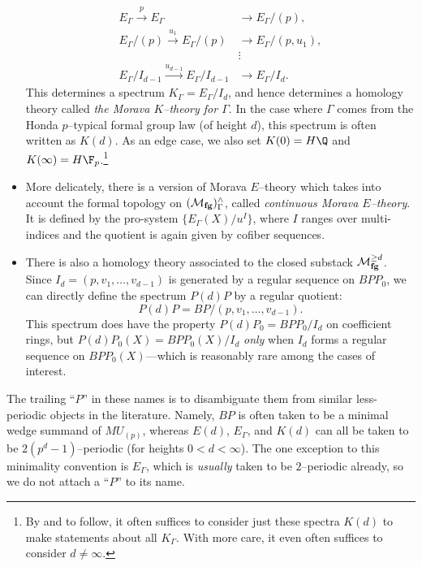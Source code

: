 \begin{definition}
\begin{itemize}
\begin{align*}
E_\Gamma \xrightarrow{p} E_\Gamma & \to E_\Gamma / (p), \\
E_\Gamma / (p) \xrightarrow{u_1} E_\Gamma / (p) & \to E_\Gamma / (p, u_1), \\
& \vdots \\
E_\Gamma / I_{d-1} \xrightarrow{u_{d-1}} E_\Gamma / I_{d-1} & \to E_\Gamma / I_d.
\end{align*}
This determines a spectrum $K_\Gamma = E_\Gamma / I_d$, and hence determines a homology theory called \textit{the Morava $K$--theory for $\Gamma$}.  In the case where $\Gamma$ comes from the Honda $p$--typical formal group law (of height $d$), this spectrum is often written as $K(d)$.  As an edge case, we also set $K(0) = H\Q$ and $K(\infty) = H\F_p$.\footnote{By  and  to follow, it often suffices to consider just these spectra $K(d)$ to make statements about all $K_\Gamma$.  With more care, it even often suffices to consider $d \ne \infty$.}
\item More delicately, there is a version of Morava $E$--theory which takes into account the formal topology on $(\mathcal{M}_{\mathbf{fg}})^\wedge_\Gamma$, called \textit{continuous Morava $E$--theory}.  It is defined by the pro-system $\{E_\Gamma(X) / u^I\}$, where $I$ ranges over multi-indices and the quotient is again given by cofiber sequences.
\item There is also a homology theory associated to the closed substack $\mathcal{M}_{\mathbf{fg}}^{\ge d}$.  Since $I_d = (p, v_1, \ldots, v_{d-1})$ is generated by a regular sequence on $BPP_0$, we can directly define the spectrum $P(d)P$ by a regular quotient: \[P(d)P = BP / (p, v_1, \ldots, v_{d-1}).\]  This spectrum does have the property $P(d)P_0 = BPP_0 / I_d$ on coefficient rings, but $P(d)P_0(X) = BPP_0(X) / I_d$ \emph{only} when $I_d$ forms a regular sequence on $BPP_0(X)$---which is reasonably rare among the cases of interest.
\end{itemize}
\end{definition}

\begin{remark}
The trailing ``$P$'' in these names is to disambiguate them from similar less-periodic objects in the literature.  Namely, $BP$ is often taken to be a minimal wedge summand of $MU_{(p)}$, whereas $E(d)$, $E_\Gamma$, and $K(d)$ can all be taken to be $2(p^d-1)$--periodic (for heights $0 < d < \infty$).  The one exception to this minimality convention is $E_\Gamma$, which is \emph{usually} taken to be $2$--periodic already, so we do not attach a ``$P$'' to its name.
\end{remark}


